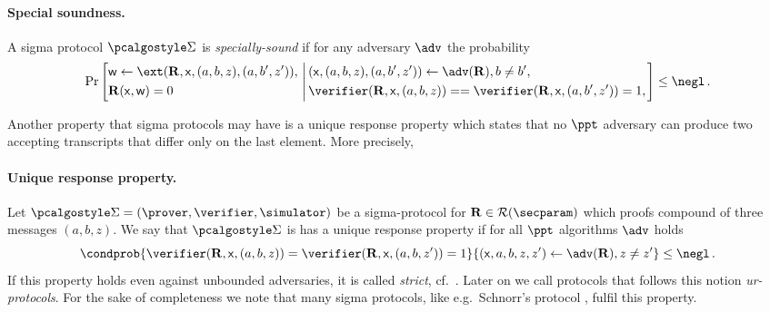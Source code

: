 \documentclass[runningheads,11pt]{llncs}
\theoremstyle{definition} \newtheorem{definition}[theorem]{Definition}
\begin{document}
\paragraph{Special soundness.} A sigma protocol $\sigmaprot$ is \emph{specially-sound}
  if for any adversary $\adv$ the probability
	\[
		\Pr\left[
		\begin{aligned}
				& \wit \gets \ext(\REL, \inp, (a, b, z), (a, b', z')),\\
				& \REL(\inp, \wit) = 0
		\end{aligned}
		\,\left|\,
		\begin{aligned}
          & (\inp, (a, b, z), (a, b', z')) \gets \adv(\REL), %
           b \neq b',  \\
          & \verifier(\REL, \inp, (a, b, z)) = %
           = \verifier(\REL, \inp, (a, b', z')) = 1, \\
		\end{aligned}
		\right.\right] \leq  \negl\,.
	\]

Another property that sigma protocols may have is a unique response
property \cite{C:Fischlin05} which states that no $\ppt$ adversary can
produce two accepting transcripts that differ only on the last
element. More precisely, 
\paragraph{Unique response property.} Let
$\sigmaprot = (\prover, \verifier, \simulator)$ be a sigma-protocol for
$\REL \in \RELGEN(\secparam)$ which proofs compound of three messages
$(a, b, z)$. We say that $\sigmaprot$ is has a unique response property if for
all $\ppt$ algorithms $\adv$ holds
\[ \condprob{\verifier (\REL, \inp, (a, b, z)) = \verifier (\REL, \inp, (a, b,
    z')) = 1}{(\inp, a, b, z, z') \gets \adv(\REL), z \neq z'} \leq \negl\,.  \]
If this property holds even against unbounded adversaries, it is called
\emph{strict}, cf.~\cite{INDOCRYPT:FKMV12}. Later on we call protocols that
follows this notion \emph{ur-protocols}. For the sake of completeness we note
that many sigma protocols, like e.g.~Schnorr's protocol \cite{C:Schnorr89},
fulfil this property.
\end{document}
